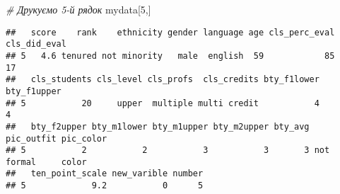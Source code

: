 \documentclass[
]{article}
\newenvironment{Shaded}{\begin{snugshade}}{\end{snugshade}}
\newcommand{\CommentTok}[1]{\textcolor[rgb]{0.56,0.35,0.01}{\textit{#1}}}
\newcommand{\DecValTok}[1]{\textcolor[rgb]{0.00,0.00,0.81}{#1}}
\newcommand{\NormalTok}[1]{#1}
\newcommand{\OperatorTok}[1]{\textcolor[rgb]{0.81,0.36,0.00}{\textbf{#1}}}
\newcommand{\StringTok}[1]{\textcolor[rgb]{0.31,0.60,0.02}{#1}}
\begin{document}
\begin{Shaded}
\begin{Highlighting}[]
\CommentTok{# Друкуємо 5-й рядок}
\NormalTok{mydata[}\DecValTok{5}\NormalTok{,]}
\end{Highlighting}
\end{Shaded}

\begin{verbatim}
##   score    rank    ethnicity gender language age cls_perc_eval cls_did_eval
## 5   4.6 tenured not minority   male  english  59            85           17
##   cls_students cls_level cls_profs  cls_credits bty_f1lower bty_f1upper
## 5           20     upper  multiple multi credit           4           4
##   bty_f2upper bty_m1lower bty_m1upper bty_m2upper bty_avg pic_outfit pic_color
## 5           2           2           3           3       3 not formal     color
##   ten_point_scale new_varible number
## 5             9.2           0      5
\end{verbatim}

\begin{Shaded}
\end{Shaded}
\end{document}

